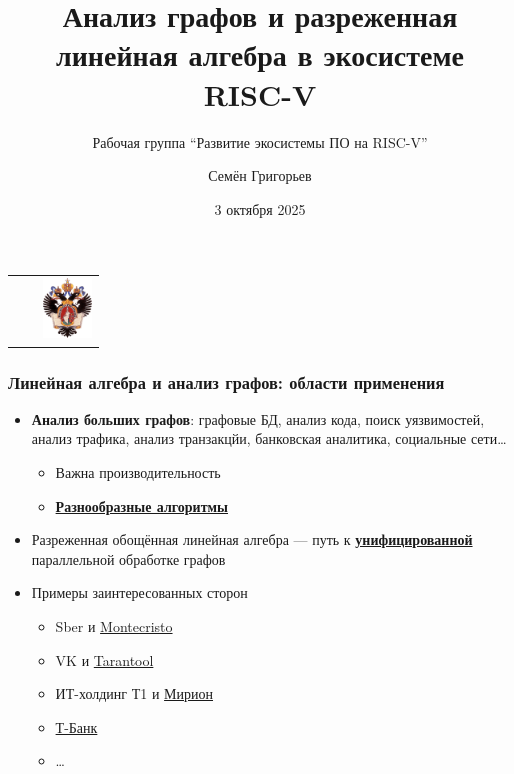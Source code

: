 \documentclass[xcolor=table,aspectratio=169]{beamer}
\title[GraphBLAS на RISC-V]{Анализ графов и разреженная линейная алгебра в экосистеме RISC-V}
\subtitle{Рабочая группа ``Развитие экосистемы ПО на RISC-V''}
\institute[СПбГУ]{
Санкт-Петербургский Государственный Университет
}
\author[Семён Григорьев]{Семён Григорьев}
\date{3 октября 2025}
\begin{document}
{
\begin{frame}[fragile]
  \begin{table}
  \centering
  \begin{tabularx}{\linewidth}{XcX}
    \hfill
    & 
    & \hfill \includegraphics[height=1.6cm]{pictures/SPbGU_Logo.png}
  \end{tabularx}
  \end{table}
  \titlepage
\end{frame}
}

\begin{frame}[fragile]
  \frametitle{Линейная алгебра и анализ графов: области применения}
  \begin{itemize}
    \item \textbf{Анализ больших графов}: графовые БД, анализ кода, поиск уязвимостей, анализ трафика, анализ транзакцйи, банковская аналитика, социальные сети\ldots
      \begin{itemize}        
        \item Важна производительность
        \item \underline{\textbf{Разнообразные алгоритмы}}        
      \end{itemize}
    \item Разреженная обощённая линейная алгебра --- путь к \underline{\textbf{унифицированной}} параллельной обработке графов 
    \item Примеры заинтересованных сторон
      \begin{itemize}
        \item Sber и \href{https://cdn-app.sberdevices.ru/misc/0.0.0/assets/common/825c0d52_1_bulavin_slide.pdf}{Montecristo}
        \item VK и \href{https://habr.com/ru/companies/vk/articles/665156/}{Tarantool}
        \item ИТ-холдинг Т1 и \href{https://habr.com/ru/companies/T1Holding/articles/755174/}{Мирион}
        \item \href{https://highload.ru/spb/2025/abstracts/14537}{Т-Банк}
        \item \ldots
      \end{itemize}
    \end{itemize}
\end{frame}
\end{document}
